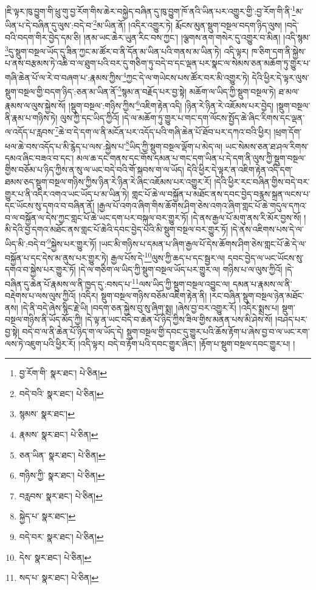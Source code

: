 །ཇི་ལྟར་ཁུ་བྱུག་གི་ཕྲུ་གུ་བྱ་རོག་གིས་ཆེར་བསྐྱེད་བཞིན་དུ་ཁུ་བྱུག་ཁོ་ནའི་ཡིན་པར་འགྱུར་གྱི་:བྱ་རོག་གི་ནི་\footnote{བྱ་རོག་གི་  སྣར་ཐང་།  པེ་ཅིན། }མ་ཡིན་པ་དེ་བཞིན་དུ་ལུས་:བདེ་བ་\footnote{བདེ་བའི་  སྣར་ཐང་།  པེ་ཅིན། }མ་ཡིན་ནོ། །འདིར་འགྱུར་ཏེ། རྨོངས་མུན་སྡུག་བསྔལ་བདག་ཉིད་ལུས། །བདེ་བའི་བདག་གིར་བྱེད་དམ་ཅི། །ནམ་ཡང་ཆེར་ཡུན་རིང་བས་ཀྱང་། །ལྕགས་ནག་གསེར་དུ་འགྱུར་བ་མིན། །འདི་སྙམ་\footnote{སྙམས་  སྣར་ཐང་། }དུ་སྡུག་བསྔལ་ཡོད་དུ་ཟིན་ཀྱང་མ་ཚོར་བ་ནི་དོན་མ་ཡིན་པའི་གནས་མ་ཡིན་ཏེ། འདི་ལྟར། ཁ་ཅིག་དག་ནི་སྐྱེས་པ་ནས་བརྩམས་ཏེ་འཆི་བ་ལ་ཐུག་པའི་བར་དུ་གཅིག་ཏུ་བདེ་བ་དང་ལྡན་པར་སྣང་ལ་སེམས་ཅན་མཆོག་ཏུ་གྱུར་པ་གཞི་ཆེན་པོ་ལ་རེ་བ་བཞག་པ་:རྣམས་ཀྱིས་\footnote{རྣམས་  སྣར་ཐང་།  པེ་ཅིན། }ཀྱང་དེ་ལ་གཡེངས་པས་ཚོར་བར་མི་འགྱུར་ཏེ། དེའི་ཕྱིར་དེ་ལྟར་ལུས་སྡུག་བསྔལ་གྱི་བདག་ཉིད་:ཅན་མ་ཡིན་ནོ་\footnote{ཅན་ཡིན་  སྣར་ཐང་།  པེ་ཅིན། }སྙམ་ན་བརྗོད་པར་བྱ་སྟེ། མཆོག་ལ་ཡིད་ཀྱི་སྡུག་བསྔལ་ཏེ། ཐ་མལ་རྣམས་ལ་ལུས་སྐྱེས་སོ། །སྡུག་བསྔལ་:གཉིས་ཀྱིས་\footnote{གཉིས་ཀྱི་  སྣར་ཐང་།  པེ་ཅིན། }འཇིག་རྟེན་འདི། །ཉིན་རེ་ཉིན་རེ་འཇོམས་པར་བྱེད། །སྡུག་བསྔལ་ནི་རྣམ་པ་གཉིས་ཏེ། ལུས་ཀྱི་དང་ཡིད་ཀྱིའོ། །དེ་ལ་མཆོག་ཏུ་གྱུར་པ་གང་དག་ལོངས་སྤྱོད་ཆེ་ཞིང་རིགས་དང་ལྡན་ལ་འདོད་པ་རླབས་\footnote{བརླབས་  སྣར་ཐང་།  པེ་ཅིན། }ཆེ་བ་དེ་དག་ལ་ནི་མངོན་པར་འདོད་པའི་གཞི་ཆེན་པོ་ཐོབ་པར་དཀའ་བའི་ཕྱིར། །ཕྲག་དོག་ཕལ་ཆེ་བས་འདོད་པ་མི་རྙེད་པ་ལས་:སྐྱེས་པ་\footnote{སྐྱེད་པ་  སྣར་ཐང་། }ཡིད་ཀྱི་སྡུག་བསྔལ་ལྡོག་པ་མེད་ལ། ཡང་སེམས་ཅན་ཐ་ཤལ་རིགས་དམའ་ཞིང་བཟའ་བ་དང་། མལ་ཆ་དང་གནས་དང་གོས་དམན་པ་གང་དག་ཡིན་པ་དེ་དག་ནི་ལུས་ཀྱི་སྡུག་བསྔལ་གྱིས་བཅོམ་པ་ཉིད་ཀྱིས་ན་སུ་ལ་ཡང་བདེ་བའི་གོ་སྐབས་ག་ལ་ཡོད། དེའི་ཕྱིར་དེ་ལྟར་ན་འཇིག་རྟེན་འདི་དག་ཐམས་ཅད་སྡུག་བསྔལ་གཉིས་ཀྱིས་ཉིན་རེ་ཉིན་རེ་ཞིང་འཇོམས་པར་འགྱུར་རོ། །དེའི་ཕྱིར་རང་བཞིན་གྱིས་བདེ་བར་གྱུར་པ་ནི་འདིར་འགའ་ཡང་ཡོད་པ་མ་ཡིན་ཏེ། གླང་པོ་ཆེ་ལ་བསྐྱོན་པ་མཐོང་ནས་དབང་བྱེད་བརྙས་སྐྲན་ལངས་པ་དང་ཡོངས་སུ་དགའ་བ་བཞིན་ནོ། །རྒྱལ་པོ་འགའ་ཞིག་གིས་ཆོགས་ཤིག་ཅེས་འགའ་ཞིག་གླང་པོ་ཆེ་གདུལ་དཀའ་བ་ལ་བསྐྱོན་ལ་དེས་ཀྱང་གླང་པོ་ཆེ་ཡང་དག་པར་བསྐུལ་བར་གྱུར་ཏོ། །དེ་ནས་རྒྱལ་པོ་མགུ་ནས་རི་མོར་བྱས་སོ། །མི་དེའི་བྱ་དགའ་མཐོང་ནས་གླང་པོ་ཆེའི་དབང་བྱེད་པའི་མི་སྡུག་བསྔལ་བར་གྱུར་ཏོ། །དེ་ནས་འཇིགས་པས་དེ་ལ་ཡིད་མི་:བདེ་བ་\footnote{བདེ་བར་  སྣར་ཐང་།  པེ་ཅིན། }སྐྱེས་པར་གྱུར་ཏོ། །ཡང་མི་གཉིས་པ་དམན་པ་ཞིག་རྒྱལ་པོ་དེས་ཆོགས་ཤིག་ཅེས་གླང་པོ་ཆེ་དེ་ལ་བསྐྱོན་པ་དང་དེས་མ་ནུས་པར་གྱུར་ཏེ། རྒྱལ་པོས་དེ་\footnote{དེས་  སྣར་ཐང་།  པེ་ཅིན། }ལུས་ཀྱི་ཆད་པ་དང་སྦྱར་ལ། དབང་བྱེད་ལ་ཡང་ཡོངས་སུ་དགའ་བ་སྐྱེས་པར་གྱུར་ཏོ། །དེ་ལ་གཅིག་ལ་ཡིད་ཀྱི་སྡུག་བསྔལ་ཡོད་པར་གྱུར་ལ། གཉིས་པ་ལ་ལུས་ཀྱིའོ། །དེ་བཞིན་དུ་ཆེན་པོ་རྣམས་ལ་ནི་ཁྱད་དུ་:བསད་པ་\footnote{སད་པ་  སྣར་ཐང་།  པེ་ཅིན། }ལས་ཡིད་ཀྱི་སྡུག་བསྔལ་འབྱུང་ལ། དམན་པ་རྣམས་ལ་ནི་བརྡེགས་པ་ལས་ལུས་ཀྱིའོ། །འདིར། སྡུག་བསྔལ་གཉིས་བཅོམ་འཇིག་རྟེན་ནི། །རང་བཞིན་སྡུག་བསྔལ་ཉེན་མཐོང་ནས། །དེ་ནི་བདེ་ཞེས་སྙིང་རྗེ་ཡི། །བདག་ཅན་སྐྱེས་བུ་སུ་ཞིག་སྨྲ། །ཞེས་བྱ་བར་འགྱུར་རོ། །འདིར་སྨྲས་པ། སྡུག་བསྔལ་གཉིས་ནི་ཡོད་མོད་ཀྱི། །དེ་ལྟ་ན་ཡང་བདེ་བ་ཆེན་པོ་ཉིད་ཀྱིས་ཟིལ་གྱིས་མནན་པས་མི་ཤེས་སོ། །བཤད་པར་བྱ་སྟེ། བདེ་བ་ལ་ནི་ཆེན་པོ་ཉིད་ག་ལ་ཡོད་དེ། སྡུག་བསྔལ་གྱི་དབང་དུ་གྱུར་པའི་ཆོས་རྟོག་པ་ཞེས་བྱ་བ་ལ་ཡང་རག་ལས་ཏེ་འཇུག་པའི་ཕྱིར་རོ། །འདི་ལྟར། བདེ་བ་རྟོག་པའི་དབང་གྱུར་ཞིང་། །རྟོག་པ་སྡུག་བསྔལ་དབང་གྱུར་པ། །
